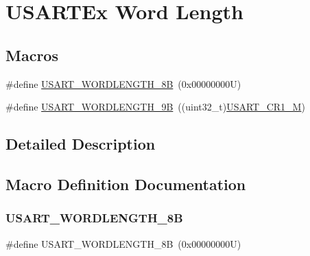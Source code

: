\hypertarget{group___u_s_a_r_t_ex___word___length}{}\section{U\+S\+A\+R\+T\+Ex Word Length}
\label{group___u_s_a_r_t_ex___word___length}
\subsection*{Macros}
\begin{DoxyCompactItemize}
\item 
\#define \hyperlink{group___u_s_a_r_t_ex___word___length_gae2978458689a31bed9a8a3e66ed84f50}{U\+S\+A\+R\+T\+\_\+\+W\+O\+R\+D\+L\+E\+N\+G\+T\+H\+\_\+8B}~(0x00000000\+U)
\item 
\#define \hyperlink{group___u_s_a_r_t_ex___word___length_ga3a8363f7dccf85ccb52d698e0900f347}{U\+S\+A\+R\+T\+\_\+\+W\+O\+R\+D\+L\+E\+N\+G\+T\+H\+\_\+9B}~((uint32\+\_\+t)\hyperlink{group___peripheral___registers___bits___definition_ga95f0288b9c6aaeca7cb6550a2e6833e2}{U\+S\+A\+R\+T\+\_\+\+C\+R1\+\_\+M})
\end{DoxyCompactItemize}


\subsection{Detailed Description}


\subsection{Macro Definition Documentation}
\mbox{\label{group___u_s_a_r_t_ex___word___length_gae2978458689a31bed9a8a3e66ed84f50}} 
\subsubsection{\texorpdfstring{U\+S\+A\+R\+T\+\_\+\+W\+O\+R\+D\+L\+E\+N\+G\+T\+H\+\_\+8B}{USART\_WORDLENGTH\_8B}}
{\footnotesize\ttfamily \#define U\+S\+A\+R\+T\+\_\+\+W\+O\+R\+D\+L\+E\+N\+G\+T\+H\+\_\+8B~(0x00000000\+U)}

